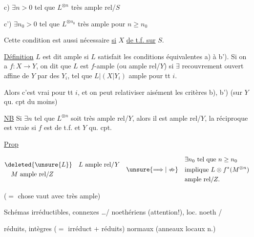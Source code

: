 c) $\exists n>0$ tel que $L^{\otimes n}$ très ample rel/$S$

c') $\exists n_0>0$ tel que $L^{\otimes n_0}$ très ample pour $n\geq n_0$

Cette condition est aussi nécessaire \uline{si}  $X$ \uline{de t.f. sur} $S$.

\uline{Définition} $L$ est dit ample si $L$ satisfait les conditions équivalentes a) à b'). Si  on a $f:X\longrightarrow Y$,   on dit que $L$ est $f$-ample (ou ample rel/$Y$)  si $\exists$ recouvrement ouvert affine de $Y$ par des $Y_i$, tel que  $L|(X|Y_i)$ ample pour tt $i$.

 Alors c'est vrai pour tt $i$, et on peut relativiser aisément les  critères b), b') (sur $Y$ qu. cpt du moins)


\uline{NB} Si $\exists n$ tel que $L^{\otimes n}$ soit très ample rel/$Y$, alors il est ample rel/$Y$, la réciproque est vraie si $f$ est de t.f. et $Y$ qu. cpt.

\uline{Prop}


\[
\begin{aligned}
 &\deleted{\unsure{L}}\quad L\ \text{ample rel}/Y\\
 &\quad M\ \text{ample rel}/Z
\end{aligned}
\quad\unsure{\Longrightarrow|\nRightarrow}\quad
\begin{aligned}
 &\exists n_0\ \text{tel que }n\geq n_0\\
 &\text{implique } L\otimes f^*(M^{\otimes n})\\
 &\text{ample rel}/Z.
\end{aligned}
\]

($=$ chose vaut avec très ample)

Schémas irréductibles, connexes \ldots / noethériens (attention!), loc. noeth /

réduits, intègres ($={}$ irréduct $+$ réduits) normaux  (anneaux locaux n.) 

